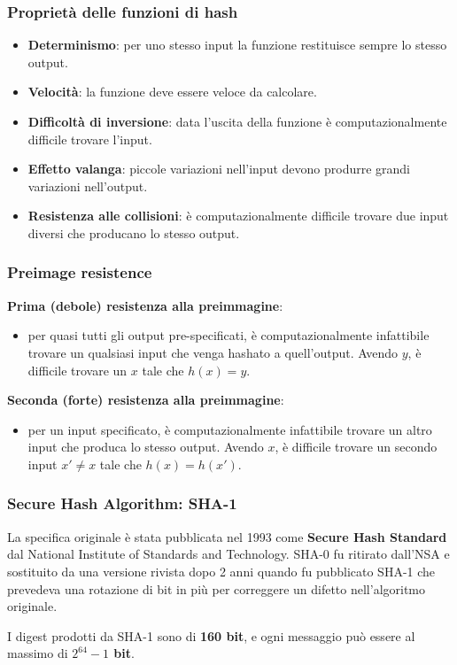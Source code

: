 \begin{frame}
\frametitle{Proprietà delle funzioni di hash}

\begin{itemize}
    \item \textbf{Determinismo}: per uno stesso input la funzione restituisce sempre lo stesso output.
    \item \textbf{Velocità}: la funzione deve essere veloce da calcolare.
    \item \textbf{Difficoltà di inversione}: data l'uscita della funzione è computazionalmente difficile trovare l'input.
    \item \textbf{Effetto valanga}: piccole variazioni nell'input devono produrre grandi variazioni nell'output.
    \item \textbf{Resistenza alle collisioni}: è computazionalmente difficile trovare due input diversi che producano lo stesso output.
\end{itemize}
\end{frame}

\begin{frame}
\frametitle{Preimage resistence}
\textbf{Prima (debole) resistenza alla preimmagine}:
\begin{itemize}
    \item per quasi tutti gli output pre-specificati, è computazionalmente infattibile trovare un qualsiasi input che venga hashato a quell'output.
    Avendo \( y \), è difficile trovare un \( x \) tale che \( h(x) = y \).
\end{itemize}
\textbf{Seconda (forte) resistenza alla preimmagine}:
\begin{itemize}
    \item per un input specificato, è computazionalmente infattibile trovare un altro input che produca lo stesso output.
     Avendo \( x \), è difficile trovare un secondo input \( x' \neq x \) tale che \( h(x) = h(x') \).
\end{itemize}

\end{frame}

\begin{frame}
\frametitle{Secure Hash Algorithm: SHA-1}

La specifica originale è stata pubblicata nel 1993 come \textbf{Secure Hash Standard} dal National Institute of Standards and Technology.
SHA-0 fu ritirato dall'NSA e sostituito da una versione rivista dopo 2 anni quando fu pubblicato SHA-1 che prevedeva una rotazione di bit in più
per correggere un difetto nell'algoritmo originale.

\vspace{1cm}

I digest prodotti da SHA-1 sono di \textbf{160 bit}, e ogni messaggio può essere al massimo di \textbf{\(2^{64} - 1\) bit}.
\end{frame}


